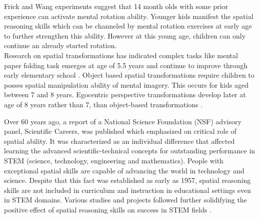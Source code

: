 Frick and Wang \parencite{frick2010round} experiments suggest that 14 month olds with some prior experience can activate mental rotation ability. Younger kids manifest the spatial reasoning skills which can be channeled by mental rotation exercises at early age to further strengthen this ability. However at this young age, children can only continue an already started rotation.\\
Research on spatial transformations has indicated complex tasks like mental paper folding task emerges at age of 5.5 years and continue to improve through early elementary school \parencite{harris2013new}. Object based spatial transformations require children to posses spatial manipulation ability of mental imagery. This occurs for kids aged between 7 and 8 years. Egocentric perspective transformations develop later at age of 8 years rather than 7, than object-based transformations \parencite{crescentini2014mental}. 

Over 60 years ago, a report of a National Science Foundation (NSF) advisory panel, Scientific Careers, was published \parencite{super1957scientific} which emphasized on critical role of spatial ability. It was characterized as an individual difference that affected learning the advanced scientific-technical concepts for outstanding performance in STEM (science, technology, engineering and mathematics). People with exceptional spatial skills are capable of advancing the world in technology and science. Despite that this fact was established as early as 1957, spatial reasoning skills are not included in curriculum and instruction in educational settings even in STEM domains. Various studies and projects followed further solidifying the positive effect of spatial reasoning skills on success in STEM fields \parencite{wai2009spatial}. \\

